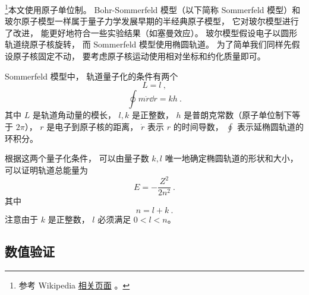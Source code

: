 

\footnote{参考 Wikipedia \href{https://en.wikipedia.org/wiki/Old_quantum_theory}{相关页面}
。}本文使用原子单位制。 Bohr-Sommerfeld 模型（以下简称 Sommerfeld 模型）和玻尔原子模型一样属于量子力学发展早期的半经典原子模型， 它对玻尔模型进行了改进， 能更好地符合一些实验结果（如塞曼效应）。 玻尔模型假设电子以圆形轨道绕原子核旋转， 而 Sommerfeld 模型使用椭圆轨道。 为了简单我们同样先假设原子核固定不动， 要考虑原子核运动使用相对坐标和约化质量即可。

Sommerfeld 模型中， 轨道量子化的条件有两个
\begin{equation}\label{eq_BohrEc_4}
L = l~,
\end{equation}
\begin{equation}\label{eq_BohrEc_3}
\oint m\dot r \dd{r} = kh~.
\end{equation}
其中 $L$ 是轨道角动量的模长， $l, k$ 是正整数， $h$ 是普朗克常数（原子单位制下等于 $2\pi$）， $r$ 是电子到原子核的距离， $\dot r$ 表示 $r$ 的时间导数， $\oint$ 表示延椭圆轨道的环积分。

根据这两个量子化条件， 可以由量子数 $k, l$ 唯一地确定椭圆轨道的形状和大小， 可以证明轨道总能量为
\begin{equation}\label{eq_BohrEc_5}
E = -\frac{Z^2}{2n^2}~.
\end{equation}
其中
\begin{equation}\label{eq_BohrEc_2}
n = l + k~.
\end{equation}
注意由于 $k$ 是正整数， $l$ 必须满足 $0 < l < n$。

\subsection{数值验证}


